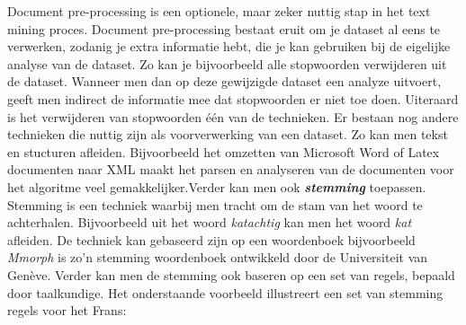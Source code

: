 Document pre-processing is een optionele, maar zeker nuttig stap in het text mining proces. Document pre-processing bestaat eruit om je dataset al eens te verwerken, zodanig je extra informatie hebt, die je kan gebruiken bij de eigelijke analyse van de dataset. Zo kan je bijvoorbeeld alle stopwoorden verwijderen uit de dataset. Wanneer men dan op deze gewijzigde dataset een analyze uitvoert, geeft men indirect de informatie mee dat stopwoorden er niet toe doen. Uiteraard is het verwijderen van stopwoorden \'e\'en van de technieken.  Er bestaan nog andere technieken die nuttig zijn als voorverwerking van een dataset. Zo kan men tekst en stucturen afleiden. Bijvoorbeeld het omzetten van Microsoft Word of Latex documenten naar XML maakt het parsen en analyseren van de documenten voor het algoritme veel gemakkelijker.Verder kan men ook \textbf{\textit{stemming}} toepassen. Stemming is een techniek waarbij men tracht om de stam van het woord te achterhalen. Bijvoorbeeld uit het woord \textit{katachtig} kan men het woord \textit{kat} afleiden. De techniek kan gebaseerd zijn op een woordenboek bijvoorbeeld \textit{Mmorph} is zo'n stemming woordenboek ontwikkeld door de Universiteit van Gen\`eve. Verder kan men de stemming ook baseren op een set van regels, bepaald door taalkundige. Het onderstaande voorbeeld illustreert een set van stemming regels voor het Frans:

